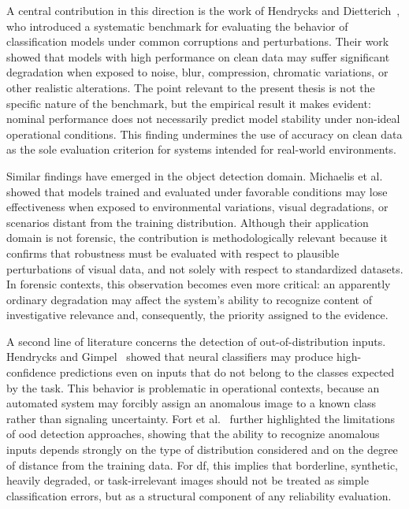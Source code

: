 A central contribution in this direction is the work of Hendrycks and
Dietterich~\cite{hendrycks2019benchmarking}, who introduced a systematic
benchmark for evaluating the behavior of classification models under common
corruptions and perturbations. Their work showed that models with high
performance on clean data may suffer significant degradation when exposed to
noise, blur, compression, chromatic variations, or other realistic alterations.
The point relevant to the present thesis is not the specific nature of the
benchmark, but the empirical result it makes evident: nominal performance does
not necessarily predict model stability under non-ideal operational conditions.
This finding undermines the use of accuracy on clean data as the sole
evaluation criterion for systems intended for real-world environments.

Similar findings have emerged in the object detection domain. Michaelis et
al.~\cite{michaelis2019winter} showed that models trained and evaluated under
favorable conditions may lose effectiveness when exposed to environmental
variations, visual degradations, or scenarios distant from the training
distribution. Although their application domain is not forensic, the
contribution is methodologically relevant because it confirms that robustness
must be evaluated with respect to plausible perturbations of visual data, and
not solely with respect to standardized datasets. In forensic contexts, this
observation becomes even more critical: an apparently ordinary degradation may
affect the system's ability to recognize content of investigative relevance
and, consequently, the priority assigned to the evidence.

A second line of literature concerns the detection of out-of-distribution
inputs. Hendrycks and Gimpel~\cite{hendrycks2017baseline} showed that neural
classifiers may produce high-confidence predictions even on inputs that do not
belong to the classes expected by the task. This behavior is problematic in
operational contexts, because an automated system may forcibly assign an
anomalous image to a known class rather than signaling uncertainty. Fort et
al.~\cite{fort2021exploring} further highlighted the limitations of \gls{ood}
detection approaches, showing that the ability to recognize anomalous inputs
depends strongly on the type of distribution considered and on the degree of
distance from the training data. For \gls{df}, this implies that borderline,
synthetic, heavily degraded, or task-irrelevant images should not be treated as
simple classification errors, but as a structural component of any reliability
evaluation.

